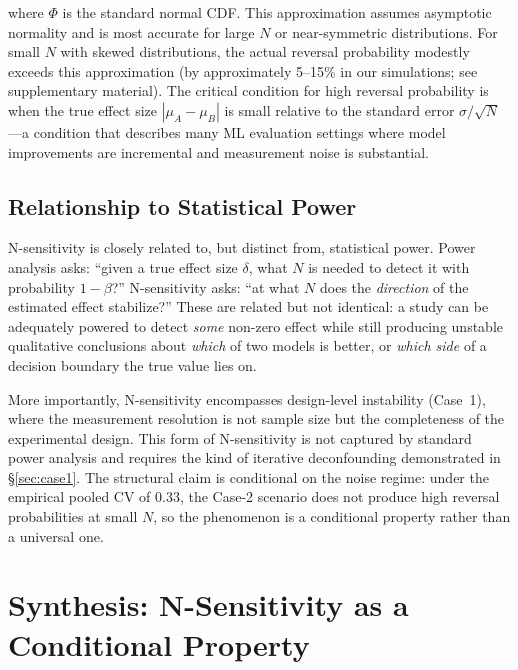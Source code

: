\documentclass[11pt]{article}
\begin{document}
where $\Phi$ is the standard normal CDF. This approximation assumes asymptotic normality and is most accurate for large $N$ or near-symmetric distributions. For small $N$ with skewed distributions, the actual reversal probability modestly exceeds this approximation (by approximately 5--15\% in our simulations; see supplementary material). The critical condition for high reversal probability is when the true effect size $|\mu_A - \mu_B|$ is small relative to the standard error $\sigma/\sqrt{N}$---a condition that describes many ML evaluation settings where model improvements are incremental and measurement noise is substantial.

\subsection{Relationship to Statistical Power}

N-sensitivity is closely related to, but distinct from, statistical power. Power analysis asks: ``given a true effect size $\delta$, what $N$ is needed to detect it with probability $1-\beta$?'' N-sensitivity asks: ``at what $N$ does the \emph{direction} of the estimated effect stabilize?'' These are related but not identical: a study can be adequately powered to detect \emph{some} non-zero effect while still producing unstable qualitative conclusions about \emph{which} of two models is better, or \emph{which side} of a decision boundary the true value lies on.

More importantly, N-sensitivity encompasses design-level instability (Case~1), where the measurement resolution is not sample size but the completeness of the experimental design. This form of N-sensitivity is not captured by standard power analysis and requires the kind of iterative deconfounding demonstrated in \S\ref{sec:case1}. The structural claim is conditional on the noise regime: under the empirical pooled CV of $0.33$, the Case-2 scenario does not produce high reversal probabilities at small $N$, so the phenomenon is a conditional property rather than a universal one.

\section{Synthesis: N-Sensitivity as a Conditional Property}
\label{sec:synthesis}
\end{document}
